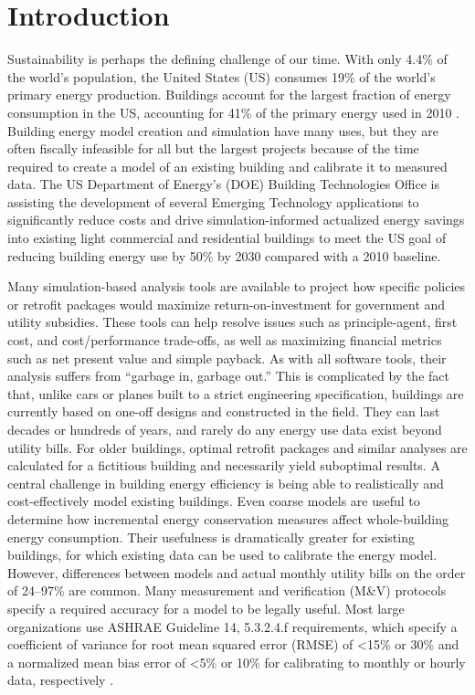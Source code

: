 \documentclass[preprint, review, 12pt]{elsarticle}
\begin{document}
\section{Introduction}
\label{sec:introduction}
Sustainability is perhaps the defining challenge of our time. With only 4.4\% of the world's population, the United States (US) consumes 19\% of the world's primary energy production. Buildings account for the largest fraction of energy consumption in the US, accounting for 41\% of the primary energy used in 2010 \cite{cit:doe2012a}. Building energy model creation and simulation have many uses, but they are often fiscally infeasible for all but the largest projects because of the time required to create a model of an existing building and calibrate it to measured data. The US Department of Energy's (DOE) Building Technologies Office is assisting the development of several Emerging Technology applications to significantly reduce costs and drive simulation-informed actualized energy savings into existing light commercial and residential buildings to meet the US goal of reducing building energy use by 50\% by 2030 compared with a 2010 baseline.

Many simulation-based analysis tools are available to project how specific policies or retrofit packages would maximize return-on-investment for government and utility subsidies. These tools can help resolve issues such as principle-agent, first cost, and cost/performance trade-offs, as well as maximizing financial metrics such as net present value and simple payback. As with all software tools, their analysis suffers from ``garbage in, garbage out.'' This is complicated by the fact that, unlike cars or planes built to a strict engineering specification, buildings are currently based on one-off designs and constructed in the field. They can last decades or hundreds of years, and rarely do any energy use data exist beyond utility bills. For older buildings, optimal retrofit packages and similar analyses are calculated for a fictitious building and necessarily yield suboptimal results. A central challenge in building energy efficiency is being able to realistically and cost-effectively model existing buildings. Even coarse models are useful to determine how incremental energy conservation measures affect whole-building energy consumption. Their usefulness is dramatically greater for existing buildings, for which existing data can be used to calibrate the energy model. However, differences between models and actual monthly utility bills on the order of 24--97\% \cite{cit:earthadvantage2009,cit:roberts2012} are common. Many measurement and verification (M\&V) protocols specify a required accuracy for a model to be legally useful. Most large organizations use ASHRAE Guideline 14, 5.3.2.4.f requirements, which specify a coefficient of variance for root mean squared error (RMSE) of \textless 15\% or 30\% and a normalized mean bias error of \textless 5\% or 10\% for calibrating to monthly or hourly data, respectively \cite{cit:ashrae2002}.
\end{document}
